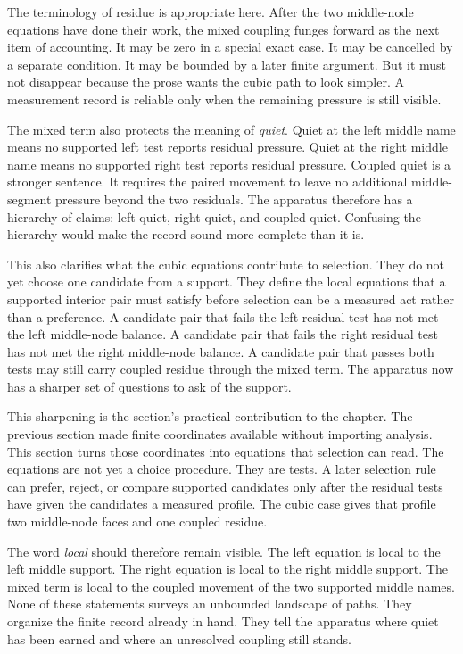 The terminology of residue is appropriate here. After the two middle-node equations have done their work, the mixed coupling funges forward as the next item of accounting. It may be zero in a special exact case. It may be cancelled by a
separate condition. It may be bounded by a later finite argument. But it must
not disappear because the prose wants the cubic path to look simpler. A
measurement record is reliable only when the remaining pressure is still
visible.

The mixed term also protects the meaning of \emph{quiet}. Quiet at the left middle
name means no supported left test reports residual pressure. Quiet at the
right middle name means no supported right test reports residual pressure.
Coupled quiet is a stronger sentence. It requires the paired movement to leave
no additional middle-segment pressure beyond the two residuals. The apparatus
therefore has a hierarchy of claims: left quiet, right quiet, and coupled
quiet. Confusing the hierarchy would make the record sound more complete than
it is.

This also clarifies what the cubic equations contribute to selection. They do
not yet choose one candidate from a support. They define the local equations
that a supported interior pair must satisfy before selection can be a
measured act rather than a preference. A candidate pair that fails the left
residual test has not met the left middle-node balance. A candidate pair that
fails the right residual test has not met the right middle-node balance. A
candidate pair that passes both tests may still carry coupled residue through
the mixed term. The apparatus now has a sharper set of questions to ask of
the support.

This sharpening is the section's practical contribution to the chapter. The
previous section made finite coordinates available without importing analysis.
This section turns those coordinates into equations that selection can read.
The equations are not yet a choice procedure. They are tests. A later
selection rule can prefer, reject, or compare supported candidates only after
the residual tests have given the candidates a measured profile. The cubic
case gives that profile two middle-node faces and one coupled residue.

The word \emph{local} should therefore remain visible. The left equation is local
to the left middle support. The right equation is local to the right middle
support. The mixed term is local to the coupled movement of the two supported
middle names. None of these statements surveys an unbounded landscape of
paths. They organize the finite record already in hand. They tell the
apparatus where quiet has been earned and where an unresolved coupling still
stands.

